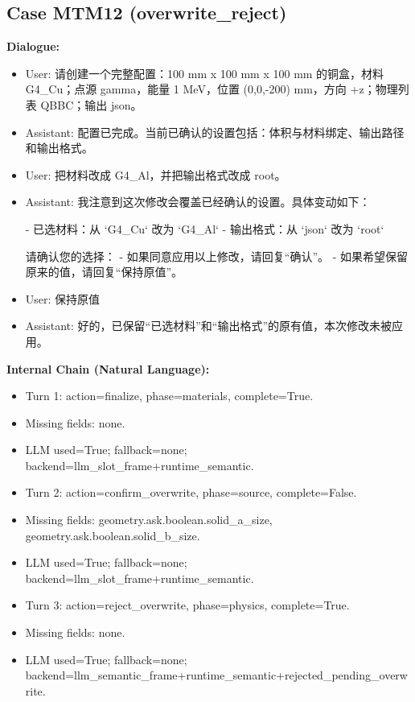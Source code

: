 \documentclass[11pt]{ctexart}
\begin{document}
\subsection{Case MTM12 (overwrite\_reject)}
\textbf{Dialogue:}
\begin{itemize}
\item User: 请创建一个完整配置：100 mm x 100 mm x 100 mm 的铜盒，材料 G4\_Cu；点源 gamma，能量 1 MeV，位置 (0,0,-200) mm，方向 +z；物理列表 QBBC；输出 json。
\item Assistant: 配置已完成。当前已确认的设置包括：体积与材料绑定、输出路径和输出格式。
\item User: 把材料改成 G4\_Al，并把输出格式改成 root。
\item Assistant: 我注意到这次修改会覆盖已经确认的设置。具体变动如下：

- 已选材料：从 `G4\_Cu` 改为 `G4\_Al`
- 输出格式：从 `json` 改为 `root`

请确认您的选择：
- 如果同意应用以上修改，请回复“确认”。
- 如果希望保留原来的值，请回复“保持原值”。
\item User: 保持原值
\item Assistant: 好的，已保留“已选材料”和“输出格式”的原有值，本次修改未被应用。
\end{itemize}
\textbf{Internal Chain (Natural Language):}
\begin{itemize}
\item Turn 1: action=finalize, phase=materials, complete=True.
\item Missing fields: none.
\item LLM used=True; fallback=none; backend=llm\_slot\_frame+runtime\_semantic.
\item Turn 2: action=confirm\_overwrite, phase=source, complete=False.
\item Missing fields: geometry.ask.boolean.solid\_a\_size, geometry.ask.boolean.solid\_b\_size.
\item LLM used=True; fallback=none; backend=llm\_slot\_frame+runtime\_semantic.
\item Turn 3: action=reject\_overwrite, phase=physics, complete=True.
\item Missing fields: none.
\item LLM used=True; fallback=none; backend=llm\_semantic\_frame+runtime\_semantic+rejected\_pending\_overwrite.
\end{itemize}
\end{document}
